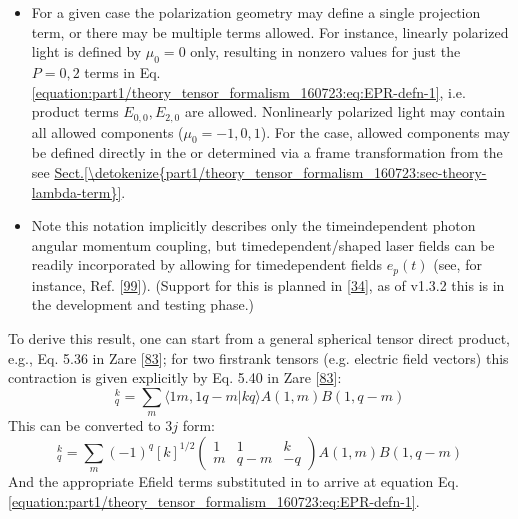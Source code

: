\documentclass[letterpaper,table,10pt,english]{jupyterBook}
\begin{document}
\begin{itemize}
\item {} 
\sphinxAtStartPar
For a given case the polarization geometry may define a single projection term, or there may be multiple terms allowed. For instance, linearly polarized light is defined by \(\mu_0=0\) only, resulting in non\sphinxhyphen{}zero values for just the \(P=0,2\) terms in Eq. \eqref{equation:part1/theory_tensor_formalism_160723:eq:EPR-defn-1}, i.e. product terms \(E_{0,0}, E_{2,0}\) are allowed. Non\sphinxhyphen{}linearly polarized light may contain all allowed components (\(\mu_0=-1,0,1\)). For the {\hyperref[\detokenize{backmatter/glossary:term-MF}]{}} case, allowed components may be defined directly in the {\hyperref[\detokenize{backmatter/glossary:term-MF}]{}} or determined via a frame transformation from the {\hyperref[\detokenize{backmatter/glossary:term-LF}]{}} \sphinxhyphen{} see \hyperref[\detokenize{part1/theory_tensor_formalism_160723:sec-theory-lambda-term}]{Sect.\@ \ref{\detokenize{part1/theory_tensor_formalism_160723:sec-theory-lambda-term}}}.

\item {} 
\sphinxAtStartPar
Note this notation implicitly describes only the time\sphinxhyphen{}independent photon angular momentum coupling, but time\sphinxhyphen{}dependent/shaped laser fields can be readily incorporated by allowing for time\sphinxhyphen{}dependent fields \(e_{p}(t)\) (see, for instance, Ref. {[}\hyperlink{cite.backmatter/bibliography:id663}{99}{]}). (Support for this is planned in  {[}\hyperlink{cite.backmatter/bibliography:id608}{34}{]}, as of v1.3.2 this is in the development and testing phase.)

\end{itemize}

\sphinxAtStartPar
To derive this result, one can start from a general spherical tensor direct product, e.g., Eq. 5.36 in Zare {[}\hyperlink{cite.backmatter/bibliography:id990}{83}{]}; for two first\sphinxhyphen{}rank tensors (e.g. electric field vectors) this contraction is given explicitly by Eq. 5.40 in Zare {[}\hyperlink{cite.backmatter/bibliography:id990}{83}{]}:
\label{equation:part1/theory_tensor_formalism_160723:c687d0ad-646f-40af-84a6-74d1f4f60796}\begin{equation}
[A^{(1)}\otimes B^{(1)}]_{q}^{k}=\sum_{m}\langle1m,1q-m|kq\rangle A(1,m)B(1,q-m)
\end{equation}
\sphinxAtStartPar
This can be converted to \(3j\) form:
\label{equation:part1/theory_tensor_formalism_160723:c08645ca-63f5-485d-a52c-5bae16e4547f}\begin{equation}
[A^{(1)}\otimes B^{(1)}]_{q}^{k}=\sum_{m}(-1)^{q}[k]^{1/2}\left(\begin{array}{ccc}
1 & 1 & k\\
m & q-m & -q
\end{array}\right)A(1,m)B(1,q-m)
\end{equation}
\sphinxAtStartPar
And the appropriate E\sphinxhyphen{}field terms substituted in to arrive at equation Eq. \eqref{equation:part1/theory_tensor_formalism_160723:eq:EPR-defn-1}.
\end{document}
